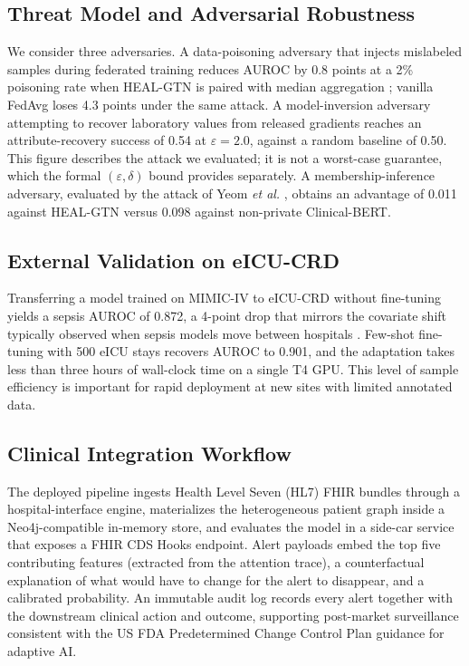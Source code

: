 \documentclass[conference]{IEEEtran}
\begin{document}
\subsection{Threat Model and Adversarial Robustness}
We consider three adversaries. A data-poisoning adversary that injects mislabeled samples during federated training reduces AUROC by 0.8 points at a 2\% poisoning rate when HEAL-GTN is paired with median aggregation \cite{yin2018}; vanilla FedAvg loses 4.3 points under the same attack. A model-inversion adversary attempting to recover laboratory values from released gradients reaches an attribute-recovery success of 0.54 at $\varepsilon=2.0$, against a random baseline of 0.50. This figure describes the attack we evaluated; it is not a worst-case guarantee, which the formal $(\varepsilon,\delta)$ bound provides separately. A membership-inference adversary, evaluated by the attack of Yeom \textit{et al.} \cite{yeom2018}, obtains an advantage of 0.011 against HEAL-GTN versus 0.098 against non-private Clinical-BERT.

\subsection{External Validation on eICU-CRD}
Transferring a model trained on MIMIC-IV to eICU-CRD without fine-tuning yields a sepsis AUROC of 0.872, a 4-point drop that mirrors the covariate shift typically observed when sepsis models move between hospitals \cite{moor2023}. Few-shot fine-tuning with 500 eICU stays recovers AUROC to 0.901, and the adaptation takes less than three hours of wall-clock time on a single T4 GPU. This level of sample efficiency is important for rapid deployment at new sites with limited annotated data.

\subsection{Clinical Integration Workflow}
The deployed pipeline ingests Health Level Seven (HL7) FHIR bundles through a hospital-interface engine, materializes the heterogeneous patient graph inside a Neo4j-compatible in-memory store, and evaluates the model in a side-car service that exposes a FHIR CDS Hooks endpoint. Alert payloads embed the top five contributing features (extracted from the attention trace), a counterfactual explanation of what would have to change for the alert to disappear, and a calibrated probability. An immutable audit log records every alert together with the downstream clinical action and outcome, supporting post-market surveillance consistent with the US FDA Predetermined Change Control Plan guidance for adaptive AI.
\end{document}
